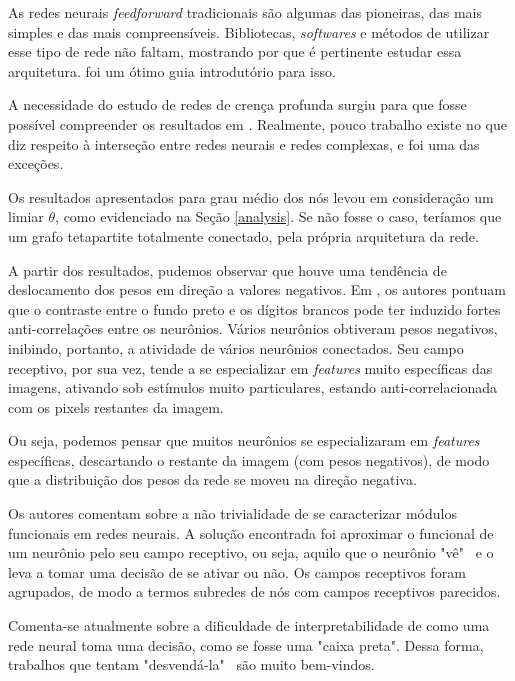 \documentclass{article}
\begin{document}
        As redes neurais \textit{feedforward} tradicionais são algumas das pioneiras, das mais simples e das mais compreensíveis.
        Bibliotecas, \textit{softwares} e métodos de utilizar esse tipo de rede não faltam, mostrando por que é pertinente estudar essa arquitetura.
        \cite{nielsen2015neural} foi um ótimo guia introdutório para isso.
        
        A necessidade do estudo de redes de crença profunda surgiu para que fosse possível compreender os resultados em \cite{testolin2018deep}.
        Realmente, pouco trabalho existe no que diz respeito à interseção entre redes neurais e redes complexas, e \cite{testolin2018deep} foi uma das exceções.

        Os resultados apresentados para grau médio dos nós levou em consideração um limiar $\theta$, como evidenciado na Seção \ref{analysis}.
        Se não fosse o caso, teríamos que um grafo tetapartite totalmente conectado, pela própria arquitetura da rede.

        A partir dos resultados, pudemos observar que houve uma tendência de deslocamento dos pesos em direção a valores negativos.
        Em \cite{testolin2018deep}, os autores pontuam que o contraste entre o fundo preto e os dígitos brancos pode ter induzido fortes anti-correlações entre os neurônios.
        Vários neurônios obtiveram pesos negativos, inibindo, portanto, a atividade de vários neurônios conectados.
        Seu campo receptivo, por sua vez, tende a se especializar em \textit{features} muito específicas das imagens, ativando sob estímulos muito particulares, estando anti-correlacionada com os pixels restantes da imagem.

        Ou seja, podemos pensar que muitos neurônios se especializaram em \textit{features} específicas, descartando o restante da imagem (com pesos negativos), de modo que a distribuição dos pesos da rede se moveu na direção negativa.

        Os autores comentam sobre a não trivialidade de se caracterizar módulos funcionais em redes neurais.
        A solução encontrada foi aproximar o funcional de um neurônio pelo seu campo receptivo, ou seja, aquilo que o neurônio "vê" \ e o leva a tomar uma decisão de se ativar ou não.
        Os campos receptivos foram agrupados, de modo a termos subredes de nós com campos receptivos parecidos.

        Comenta-se atualmente sobre a dificuldade de interpretabilidade de como uma rede neural toma uma decisão, como se fosse uma "caixa preta".
        Dessa forma, trabalhos que tentam "desvendá-la" \ são muito bem-vindos. 

    
    
\end{document}
